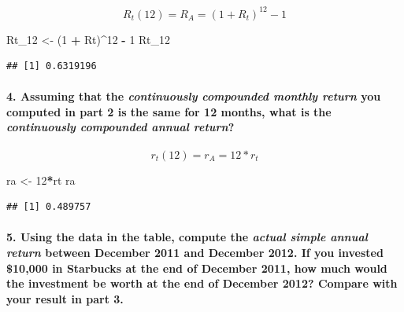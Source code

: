 \documentclass[]{article}
\newenvironment{Shaded}{\begin{snugshade}}{\end{snugshade}}
\newcommand{\DecValTok}[1]{\textcolor[rgb]{0.00,0.00,0.81}{#1}}
\newcommand{\StringTok}[1]{\textcolor[rgb]{0.31,0.60,0.02}{#1}}
\newcommand{\OperatorTok}[1]{\textcolor[rgb]{0.81,0.36,0.00}{\textbf{#1}}}
\newcommand{\NormalTok}[1]{#1}
\let\oldparagraph\paragraph
\renewcommand{\paragraph}[1]{\oldparagraph{#1}\mbox{}}
\begin{document}
\[R_t(12) = R_A = (1+R_t)^{12} - 1\]

\begin{Shaded}
\begin{Highlighting}[]
\NormalTok{Rt_}\DecValTok{12}\NormalTok{ <-}\StringTok{ }\NormalTok{(}\DecValTok{1} \OperatorTok{+}\StringTok{ }\NormalTok{Rt)}\OperatorTok{^}\DecValTok{12} \OperatorTok{-}\StringTok{ }\DecValTok{1}
\NormalTok{Rt_}\DecValTok{12}
\end{Highlighting}
\end{Shaded}

\begin{verbatim}
## [1] 0.6319196
\end{verbatim}

\paragraph{\texorpdfstring{4. Assuming that the \emph{continuously
compounded monthly return} you computed in part 2 is the same for 12
months, what is the \emph{continuously compounded annual
return}?}{4. Assuming that the continuously compounded monthly return you computed in part 2 is the same for 12 months, what is the continuously compounded annual return?}}\label{assuming-that-the-continuously-compounded-monthly-return-you-computed-in-part-2-is-the-same-for-12-months-what-is-the-continuously-compounded-annual-return}

\[r_t(12) = r_A = 12*r_t\]

\begin{Shaded}
\begin{Highlighting}[]
\NormalTok{ra <-}\StringTok{ }\DecValTok{12}\OperatorTok{*}\NormalTok{rt}
\NormalTok{ra}
\end{Highlighting}
\end{Shaded}

\begin{verbatim}
## [1] 0.489757
\end{verbatim}

\paragraph{\texorpdfstring{5. Using the data in the table, compute the
\emph{actual simple annual return} between December 2011 and December
2012. If you invested \$10,000 in Starbucks at the end of December 2011,
how much would the investment be worth at the end of December 2012?
Compare with your result in part
3.}{5. Using the data in the table, compute the actual simple annual return between December 2011 and December 2012. If you invested \$10,000 in Starbucks at the end of December 2011, how much would the investment be worth at the end of December 2012? Compare with your result in part 3.}}\label{using-the-data-in-the-table-compute-the-actual-simple-annual-return-between-december-2011-and-december-2012.-if-you-invested-10000-in-starbucks-at-the-end-of-december-2011-how-much-would-the-investment-be-worth-at-the-end-of-december-2012-compare-with-your-result-in-part-3.}
\end{document}
